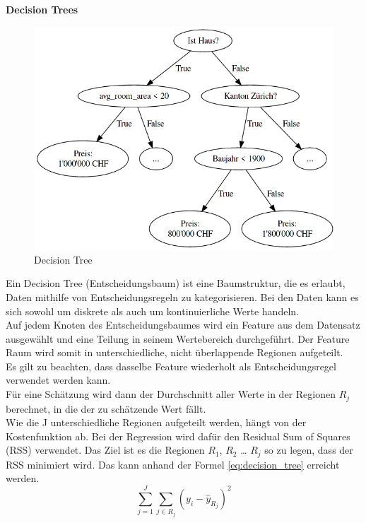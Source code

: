 \textbf{Decision Trees}\\
\begin{figure}[ht]
  \centering
  \includegraphics[width=\textwidth]{images/decision_tree.png}
  \caption[Decision Tree]{Decision Tree}%
  \label{fig:decision_tree}
\end{figure}
Ein Decision Tree (Entscheidungsbaum) ist eine Baumstruktur, die es erlaubt, Daten mithilfe von Entscheidungsregeln zu kategorisieren. Bei den Daten kann es sich sowohl um diskrete als auch um kontinuierliche Werte handeln.\\
Auf jedem Knoten des Entscheidungsbaumes wird ein Feature aus dem Datensatz ausgewählt und eine Teilung in seinem Wertebereich durchgeführt. Der Feature Raum wird somit in unterschiedliche, nicht überlappende Regionen aufgeteilt.\\[2ex]
Es gilt zu beachten, dass dasselbe Feature wiederholt als Entscheidungsregel verwendet werden kann.\\
Für eine Schätzung wird dann der Durchschnitt aller Werte in der Regionen $R_j$ berechnet, in die der zu schätzende Wert fällt.\\
Wie die  J unterschiedliche Regionen aufgeteilt werden, hängt von der Kostenfunktion ab. Bei der Regression wird dafür den Residual Sum of Squares (RSS) verwendet. Das Ziel ist es die Regionen $R_1$, $R_2$ … $R_j$ so zu legen, dass der RSS minimiert wird. Das kann anhand der Formel \eqref{eq:decision_tree} erreicht werden.
\begin{equation}
\label{eq:decision_tree}
\sum_{j=1}^{J} \sum_{j \in R_j}^{} (y_i - \hat{y}_{R_j})^2
\end{equation}
